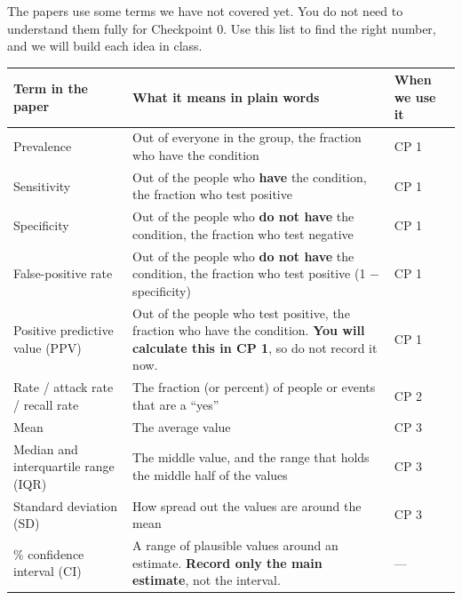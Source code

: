 \documentclass[
  letterpaper,
  DIV=11,
  numbers=noendperiod]{scrartcl}
\newcounter{none} %
\begin{document}
\begin{tcolorbox}[enhanced jigsaw, arc=.35mm, bottomrule=.15mm, bottomtitle=1mm, breakable, colback=white, colbacktitle=quarto-callout-note-color!10!white, colframe=quarto-callout-note-color-frame, coltitle=black, left=2mm, leftrule=.75mm, opacityback=0, opacitybacktitle=0.6, rightrule=.15mm, title=\textcolor{quarto-callout-note-color}{\faInfo}\hspace{0.5em}{Words you will see in the papers}, titlerule=0mm, toprule=.15mm, toptitle=1mm]

The papers use some terms we have not covered yet. You do not need to
understand them fully for Checkpoint 0. Use this list to find the right
number, and we will build each idea in class.

{\def\LTcaptype{none} %
\begin{longtable}[]{@{}
  >{\raggedright\arraybackslash}p{}
  >{\raggedright\arraybackslash}p{}
  >{\raggedright\arraybackslash}p{}@{}}
\toprule\noalign{}
\begin{minipage}[b]{\linewidth}\raggedright
Term in the paper
\end{minipage} & \begin{minipage}[b]{\linewidth}\raggedright
What it means in plain words
\end{minipage} & \begin{minipage}[b]{\linewidth}\raggedright
When we use it
\end{minipage} \\
\midrule\noalign{}
\endhead
\bottomrule\noalign{}
\endlastfoot
Prevalence & Out of everyone in the group, the fraction who have the
condition & CP 1 \\
Sensitivity & Out of the people who \textbf{have} the condition, the
fraction who test positive & CP 1 \\
Specificity & Out of the people who \textbf{do not have} the condition,
the fraction who test negative & CP 1 \\
False-positive rate & Out of the people who \textbf{do not have} the
condition, the fraction who test positive (1 − specificity) & CP 1 \\
Positive predictive value (PPV) & Out of the people who test positive,
the fraction who have the condition. \textbf{You will calculate this in
CP 1}, so do not record it now. & CP 1 \\
Rate / attack rate / recall rate & The fraction (or percent) of people
or events that are a ``yes'' & CP 2 \\
Mean & The average value & CP 3 \\
Median and interquartile range (IQR) & The middle value, and the range
that holds the middle half of the values & CP 3 \\
Standard deviation (SD) & How spread out the values are around the mean
& CP 3 \\
95\% confidence interval (CI) & A range of plausible values around an
estimate. \textbf{Record only the main estimate}, not the interval. &
--- \\
\end{longtable}
}


\end{tcolorbox}
\end{document}
